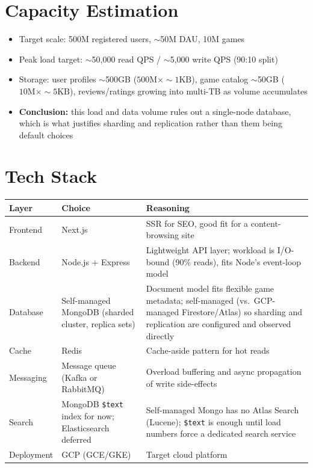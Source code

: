 \documentclass[11pt]{article}
\begin{document}
\section{Capacity Estimation}

\begin{itemize}[nosep]
    \item Target scale: 500M registered users, $\sim$50M DAU, 10M games
    \item Peak load target: $\sim$50{,}000 read QPS / $\sim$5{,}000 write QPS (90:10 split)
    \item Storage: user profiles $\sim$500GB ($500\text{M} \times \sim 1\text{KB}$), game catalog $\sim$50GB ($10\text{M} \times \sim 5\text{KB}$), reviews/ratings growing into multi-TB as volume accumulates
    \item \textbf{Conclusion:} this load and data volume rules out a single-node database, which is what justifies sharding and replication rather than them being default choices
\end{itemize}

\section{Tech Stack}

\begin{table}[h]
\centering
\begin{tabular}{@{}p{2.2cm}p{4.3cm}p{7cm}@{}}
\toprule
\textbf{Layer} & \textbf{Choice} & \textbf{Reasoning} \\
\midrule
Frontend & Next.js & SSR for SEO, good fit for a content-browsing site \\
Backend & Node.js + Express & Lightweight API layer; workload is I/O-bound (90\% reads), fits Node's event-loop model \\
Database & Self-managed MongoDB (sharded cluster, replica sets) & Document model fits flexible game metadata; self-managed (vs.\ GCP-managed Firestore/Atlas) so sharding and replication are configured and observed directly \\
Cache & Redis & Cache-aside pattern for hot reads \\
Messaging & Message queue (Kafka or RabbitMQ) & Overload buffering and async propagation of write side-effects \\
Search & MongoDB \texttt{\$text} index for now; Elasticsearch deferred & Self-managed Mongo has no Atlas Search (Lucene); \texttt{\$text} is enough until load numbers force a dedicated search service \\
Deployment & GCP (GCE/GKE) & Target cloud platform \\
\bottomrule
\end{tabular}
\end{table}
\end{document}
